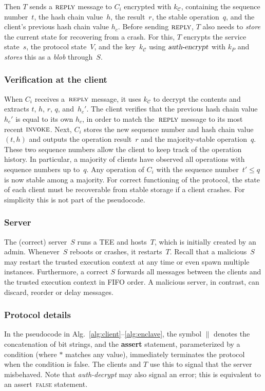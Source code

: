 \documentclass[11pt]{article}
\theoremstyle{plain-boldhead}
\theoremstyle{definition-boldhead}
\newcommand{\false}{\str{false}\xspace}
\newcommand{\str}[1]{\textsc{#1}}
\newcommand{\var}[1]{\textit{#1}}
\newcommand{\op}[1]{\textsl{#1}}
\newcommand{\CC}{\ensuremath{\mathcal{C}}\xspace}
\begin{document}
Then $T$ sends a $\str{reply}$ message to $C_i$ encrypted with $k_{\CC}$,
containing the sequence number~$t$, the hash chain value~$h$, the
result~$r$, the stable operation~$q$, and the client's previous hash chain
value $h_c$.  Before sending $\str{reply}$, $T$ also needs to \op{store}
the current state for recovering from a crash.  For this, $T$ encrypts the
service state~$s$, the protocol state~$V$, and the key~$k_{\CC}$ using
$\op{auth-encrypt}$ with $k_{P}$ and \op{stores} this as a \var{blob}
through~$S$.


\subsubsection{Verification at the client}

When $C_i$ receives a~$\str{reply}$ message, it uses $k_{\CC}$ to decrypt
the contents and extracts $t$, $h$, $r$, $q$, and~$h_c'$.  The client
verifies that the previous hash chain value~$h_c'$ is equal to its own $h_c$, in
order to match the~$\str{reply}$ message to its most recent $\str{invoke}$.
Next, $C_i$ stores the new sequence number and hash chain value $(t, h)$
and outputs the operation result~$r$ and the majority-stable operation~$q$.
%
These two sequence numbers allow the client to keep track of the operation
history.  In particular, a majority of clients have observed all operations
with sequence numbers up to~$q$.  Any operation of $C_i$ with the sequence
number~$t'\leq q$ is now stable among a majority.
% 
For correct functioning of the protocol, the state of each client must be
recoverable from stable storage if a client crashes.  For simplicity this
is not part of the pseudocode.


\subsubsection{Server}

The (correct) server~$S$ runs a TEE and hosts~$T$, which is initially
created by an admin.  Whenever~$S$ reboots or crashes, it restarts~$T$.
Recall that a malicious~$S$ may restart the trusted execution context at
any time or even spawn multiple instances.
%
Furthermore, a correct $S$ forwards all messages between the clients and
the trusted execution context in FIFO order.  A malicious server, in
contrast, can discard, reorder or delay messages.




\subsubsection{Protocol details}
% 
In the pseudocode in Alg.~\ref{alg:client}--\ref{alg:enclave}, the
symbol $\|$ denotes the concatenation of bit strings, and the
\textbf{assert} statement, parameterized by a condition (where $\ast$ matches
any value), immediately terminates the protocol when the condition is false.  The clients and $T$
use this to signal that the server misbehaved.  Note that \op{auth-decrypt}
may also signal an error; this is equivalent to an assert~\false statement.
\end{document}
